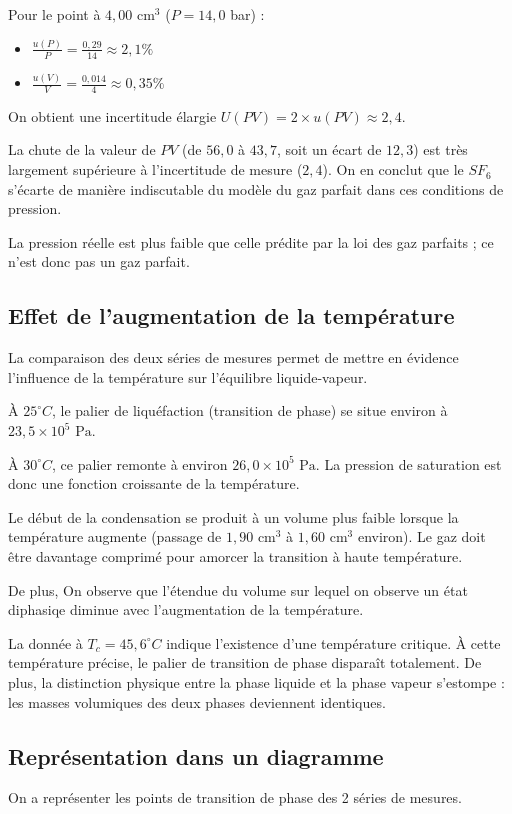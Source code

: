 \documentclass[a4paper,9pt,french]{scrartcl}
\begin{document}
Pour le point à $4,00 \text{ cm}^3$ ($P=14,0$ bar) :
\begin{itemize}
    \item $\frac{u(P)}{P} = \frac{0,29}{14} \approx 2,1 \%$
    \item $\frac{u(V)}{V} = \frac{0,014}{4} \approx 0,35 \%$
\end{itemize}
On obtient une incertitude élargie $U(PV) = 2 \times u(PV) \approx 2,4$.

La chute de la valeur de $PV$ (de $56,0$ à $43,7$, soit un écart de $12,3$) est très largement supérieure à l'incertitude de mesure ($2,4$). On en conclut que le $SF_6$ s'écarte de manière indiscutable du modèle du gaz parfait dans ces conditions de pression.

La pression réelle est plus faible que celle prédite par la loi des gaz parfaits ; ce n'est donc pas un gaz parfait.
\subsection{Effet de l'augmentation de la température}

La comparaison des deux séries de mesures permet de mettre en évidence l'influence de la température sur l'équilibre liquide-vapeur.

À $25^\circ C$, le palier de liquéfaction (transition de phase) se situe environ à $23,5 \times 10^5 \text{ Pa}$. 

À $30^\circ C$, ce palier remonte à environ $26,0 \times 10^5 \text{ Pa}$. La pression de saturation est donc une fonction croissante de la température.

Le début de la condensation se produit à un volume plus faible lorsque la température augmente (passage de $1,90 \text{ cm}^3$ à $1,60 \text{ cm}^3$ environ). Le gaz doit être davantage comprimé pour amorcer la transition à haute température.

De plus, On observe que l'étendue du volume sur lequel on observe un état diphasiqe diminue avec l'augmentation de la température.


La donnée à $T_c = 45,6^\circ C$ indique l'existence d'une température critique. À cette température précise,
le palier de transition de phase disparaît totalement. De plus, la distinction physique entre la phase liquide et la phase vapeur s'estompe : les masses volumiques des deux phases deviennent identiques.

\subsection{Représentation dans un diagramme}
On a représenter les points de transition de phase des 2 séries de mesures.
\end{document}
